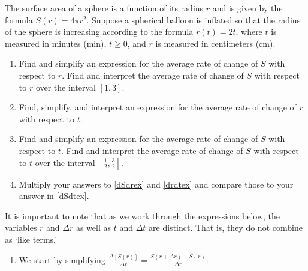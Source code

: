\documentclass{ximera}
\begin{document}
\begin{example}\label{surfaceareaex2chainrule}  The surface area of a sphere is a function of its radius $r$ and is given by the formula $S(r) = 4 \pi r^2$.  Suppose a spherical balloon is inflated so that the radius of the sphere is increasing according to the formula $r(t) = 2t$, where $t$ is measured in minutes (min), $t \geq 0$, and $r$ is measured in centimeters (cm). 

\begin{enumerate}

\item\label{dSdrex}  Find and simplify an expression for the average rate of change of $S$ with respect to $r$.   Find and interpret the average rate of change of $S$ with respect to $r$  over the interval $[1, 3]$.

\item\label{drdtex} Find, simplify, and interpret an expression for the average rate of change of $r$ with respect to $t$.

\item\label{dSdtex} Find and simplify an expression for the average rate of change of $S$ with respect to $t$.  Find and interpret the average rate of change of $S$ with respect to $t$  over the interval $\left[\frac{1}{2}, \frac{3}{2}\right]$.

\item  Multiply your answers to \ref{dSdrex} and \ref{drdtex} and compare those to your answer in \ref{dSdtex}.

\end{enumerate}

\begin{explanation} It is important to note that as we work through the expressions below, the variables $r$ and $\Delta r$ as well as $t$ and $\Delta t$ are distinct. That is, they do not combine as `like terms.'

\begin{enumerate}

\item  We start by simplifying $\frac{\Delta[S(r)]}{\Delta r} = \frac{S(r+ \Delta r) - S(r)}{\Delta r}$:

\begin{longtable}{rcl}


\end{longtable}
\end{enumerate}
\end{explanation}
\end{example}
\end{document}
